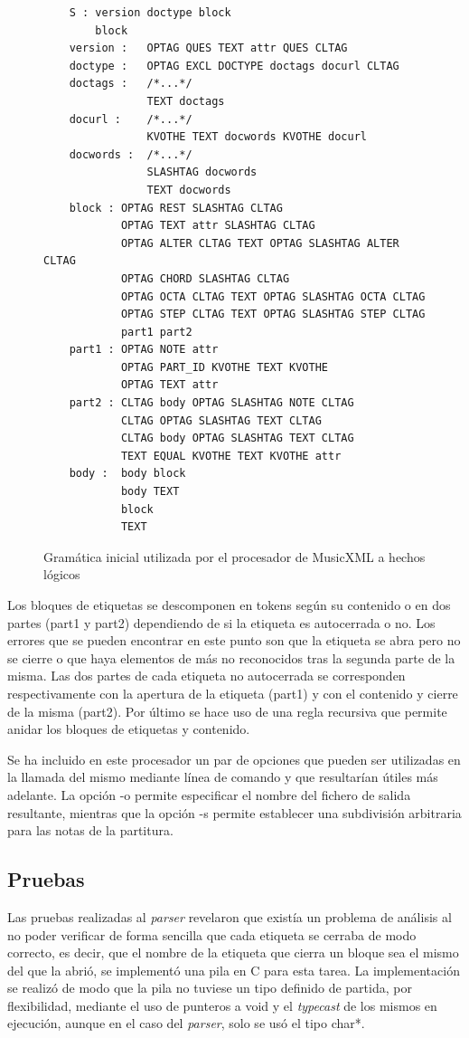 \begin{figure}
	\centering
	\begin{verbatim}
	S : version doctype block
	    block
	version : 	OPTAG QUES TEXT attr QUES CLTAG
	doctype : 	OPTAG EXCL DOCTYPE doctags docurl CLTAG
	doctags : 	/*...*/
	            TEXT doctags
	docurl : 	/*...*/
	            KVOTHE TEXT docwords KVOTHE docurl
	docwords : 	/*...*/
	            SLASHTAG docwords
	            TEXT docwords
	block : OPTAG REST SLASHTAG CLTAG
	        OPTAG TEXT attr SLASHTAG CLTAG
	        OPTAG ALTER CLTAG TEXT OPTAG SLASHTAG ALTER CLTAG
	        OPTAG CHORD SLASHTAG CLTAG
	        OPTAG OCTA CLTAG TEXT OPTAG SLASHTAG OCTA CLTAG
	        OPTAG STEP CLTAG TEXT OPTAG SLASHTAG STEP CLTAG
	        part1 part2
	part1 : OPTAG NOTE attr
	        OPTAG PART_ID KVOTHE TEXT KVOTHE
	        OPTAG TEXT attr
	part2 : CLTAG body OPTAG SLASHTAG NOTE CLTAG
	        CLTAG OPTAG SLASHTAG TEXT CLTAG
	        CLTAG body OPTAG SLASHTAG TEXT CLTAG
	        TEXT EQUAL KVOTHE TEXT KVOTHE attr
	body : 	body block
	        body TEXT
	        block
	        TEXT
	\end{verbatim}
	\caption{Gramática inicial utilizada por el procesador de MusicXML a hechos lógicos}
	\label{fig:gramatica_inicial}
\end{figure}

Los bloques de etiquetas se descomponen en tokens según su contenido o en dos partes (part1 y part2) dependiendo de si la etiqueta es autocerrada o no. Los errores que se pueden encontrar en este punto son que la etiqueta se abra pero no se cierre o que haya elementos de más no reconocidos tras la segunda parte de la misma. Las dos partes de cada etiqueta no autocerrada se corresponden respectivamente con la apertura de la etiqueta (part1) y con el contenido y cierre de la misma (part2). Por último se hace uso de una regla recursiva que permite anidar los bloques de etiquetas y contenido.

Se ha incluido en este procesador un par de opciones que pueden ser utilizadas en la llamada del mismo mediante línea de comando y que resultarían útiles más adelante. La opción -o permite especificar el nombre del fichero de salida resultante, mientras que la opción -s permite establecer una subdivisión arbitraria para las notas de la partitura.

\subsection{Pruebas}
Las pruebas realizadas al \textit{parser} revelaron que existía un problema de análisis al no poder verificar de forma sencilla que cada etiqueta se cerraba de modo correcto, es decir, que el nombre de la etiqueta que cierra un bloque sea el mismo del que la abrió, se implementó una pila en C para esta tarea. La implementación se realizó de modo que la pila no tuviese un tipo definido de partida, por flexibilidad, mediante el uso de punteros a void y el \textit{typecast} de los mismos en ejecución, aunque en el caso del \textit{parser}, solo se usó el tipo char*.

